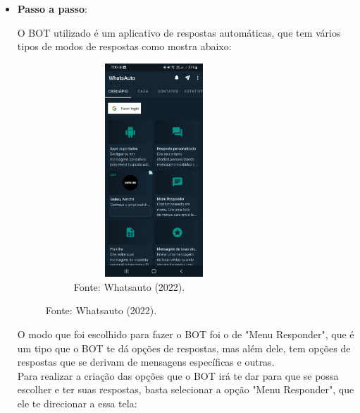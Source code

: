 \begin{itemize}

		\item \textbf{Passo a passo}: 

        O BOT utilizado é um aplicativo de respostas automáticas, que tem vários tipos de modos de respostas como mostra abaixo: \newpage	

\begin{figure}[!htb]
\centering
\captionsetup[subfigure]{labelformat=empty}
\caption{``Opções''}
\begin{subfigure}{.5\textwidth}
\centering
\includegraphics[width=6cm,height=8cm]{Partes/Imagens/Opções.jpeg}
\caption{Fonte: Whatsauto (2022).}
\end{subfigure}%
\end{figure}

        O modo que foi escolhido para fazer o BOT foi o de "Menu Responder", que é um tipo que o BOT te dá opções de respostas, mas além dele, tem opções de respostas que se derivam de mensagens específicas e outras. \\

        Para realizar a criação das opções que o BOT irá te dar para que se possa escolher e ter suas respostas, basta selecionar a opção "Menu Responder", que ele te direcionar a essa tela:  \newpage


\end{itemize}
